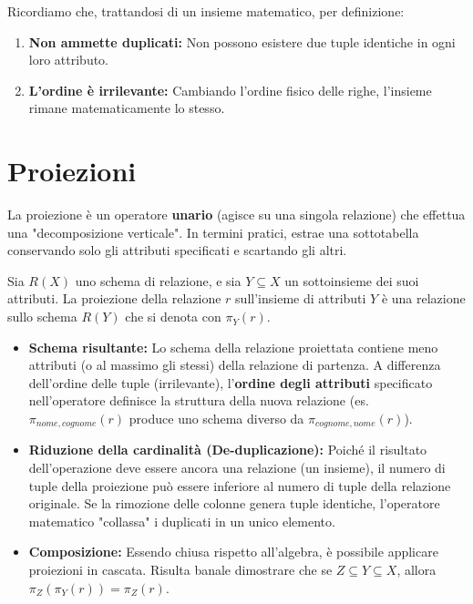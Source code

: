 \begin{observation}
Ricordiamo che, trattandosi di un insieme matematico, per definizione:
\begin{enumerate}
    \item \textbf{Non ammette duplicati:} Non possono esistere due tuple identiche in ogni loro attributo.
    \item \textbf{L'ordine è irrilevante:} Cambiando l'ordine fisico delle righe, l'insieme rimane matematicamente lo stesso.
\end{enumerate}
\end{observation}

\section{Proiezioni}

La proiezione è un operatore \textbf{unario} (agisce su una singola relazione) che effettua una "decomposizione verticale". In termini pratici, estrae una sottotabella conservando solo gli attributi specificati e scartando gli altri.

Sia $R(X)$ uno schema di relazione, e sia $Y \subseteq X$ un sottoinsieme dei suoi attributi. La proiezione della relazione $r$ sull'insieme di attributi $Y$ è una relazione sullo schema $R(Y)$ che si denota con $\pi_Y(r)$.

\begin{itemize}
    \item \textbf{Schema risultante:} Lo schema della relazione proiettata contiene meno attributi (o al massimo gli stessi) della relazione di partenza. A differenza dell'ordine delle tuple (irrilevante), l'\textbf{ordine degli attributi} specificato nell'operatore definisce la struttura della nuova relazione (es. $\pi_{nome, cognome}(r)$ produce uno schema diverso da $\pi_{cognome, nome}(r)$).
    \item \textbf{Riduzione della cardinalità (De-duplicazione):} Poiché il risultato dell'operazione deve essere ancora una relazione (un insieme), il numero di tuple della proiezione può essere inferiore al numero di tuple della relazione originale. Se la rimozione delle colonne genera tuple identiche, l'operatore matematico "collassa" i duplicati in un unico elemento.
    \item \textbf{Composizione:} Essendo chiusa rispetto all'algebra, è possibile applicare proiezioni in cascata. Risulta banale dimostrare che se $Z \subseteq Y \subseteq X$, allora $\pi_Z(\pi_Y(r)) = \pi_Z(r)$.
\end{itemize}

